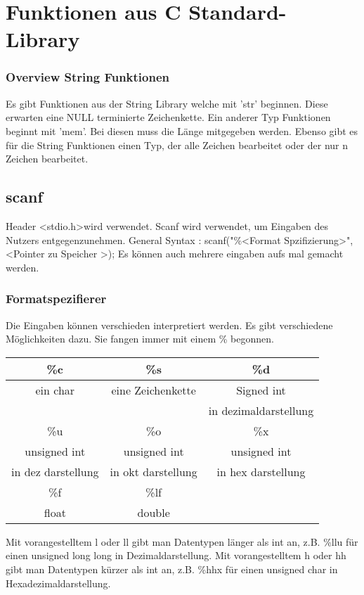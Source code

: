 \section{Funktionen aus  C Standard-Library}
\subsubsection{Overview String Funktionen}
Es gibt Funktionen aus der String Library welche mit 'str' beginnen. Diese erwarten eine NULL terminierte Zeichenkette. Ein anderer Typ Funktionen beginnt mit 'mem'. Bei diesen muss die Länge mitgegeben werden.\newline
Ebenso gibt es für die String Funktionen einen Typ, der alle Zeichen bearbeitet oder der nur n Zeichen bearbeitet.

\subsection{scanf}

Header \textless stdio.h\textgreater wird verwendet.\newline
Scanf wird verwendet, um Eingaben des Nutzers entgegenzunehmen.\newline
General Syntax : scanf("\%\textless Format Spzifizierung\textgreater", \textless Pointer zu Speicher \textgreater);\newline
Es können auch mehrere eingaben aufs mal gemacht werden.

\subsubsection{Formatspezifierer}

Die Eingaben können verschieden interpretiert werden. Es gibt verschiedene Möglichkeiten dazu. Sie fangen immer mit einem \% begonnen.\newline

\begin{center}
    \begin{tabular}{|c|c|c|} \hline  
          \%c& \%s& \%d\\ \hline  
        ein char& eine Zeichenkette& Signed int\\
 & &in dezimaldarstellung\\\hline\hline
 \%u& \%o&\%x\\\hline
 unsigned int& unsigned int&unsigned int\\
  in dez darstellung& in okt darstellung&in hex darstellung\\\hline\hline
 \%f& \%lf&\\\hline
 float& double&\\ \hline
    \end{tabular}
\end{center}
Mit vorangestelltem l oder ll gibt man Datentypen länger als int an, z.B. \%llu für einen unsigned long long in Dezimaldarstellung.\newline
Mit vorangestelltem h oder hh gibt man Datentypen kürzer als int an, z.B. \%hhx für einen unsigned char in Hexadezimaldarstellung.\newline


